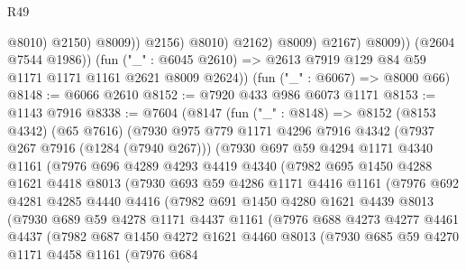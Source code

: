 \begin{lexlean}{R49}
\begin{coremodule}
                              @8010)
                            @2150)
                          @8009))
                      @2156)
                    @8010)
                  @2162)
                @8009)
              @2167)
            @8009))
        (@2604 @7544 @1986))
      (fun ("_" : @6045 @2610) => @2613 @7919 @129 @84 @59 @1171 @1171 @1161 @2621 @8009 @2624))
    (fun ("_" : @6067) => @8000 @66)
@8148 := @6066 @2610
@8152 := @7920 @433 @986 @6073 @1171
@8153 := @1143 @7916
@8338 := @7604
    (@8147
      (fun ("_" : @8148) =>
      @8152
        (@8153 @4342)
        (@65 @7616)
        (@7930
          @975
          @779
          @1171
          @4296
          @7916
          @4342
          (@7937 @267 @7916 (@1284 (@7940 @267)))
          (@7930
            @697
            @59
            @4294
            @1171
            @4340
            @1161
            (@7976
              @696
              @4289
              @4293
              @4419
              @4340
              (@7982
                @695
                @1450
                @4288
                @1621
                @4418
                @8013
                (@7930
                  @693
                  @59
                  @4286
                  @1171
                  @4416
                  @1161
                  (@7976
                    @692
                    @4281
                    @4285
                    @4440
                    @4416
                    (@7982
                      @691
                      @1450
                      @4280
                      @1621
                      @4439
                      @8013
                      (@7930
                        @689
                        @59
                        @4278
                        @1171
                        @4437
                        @1161
                        (@7976
                          @688
                          @4273
                          @4277
                          @4461
                          @4437
                          (@7982
                            @687
                            @1450
                            @4272
                            @1621
                            @4460
                            @8013
                            (@7930
                              @685
                              @59
                              @4270
                              @1171
                              @4458
                              @1161
                              (@7976
                                @684

\end{coremodule}
\end{lexlean}
